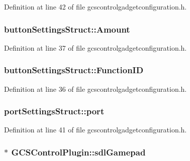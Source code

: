 Definition at line 42 of file gcscontrolgadgetconfiguration.\-h.

\hypertarget{group___g_c_s_control_gadget_plugin_gaaa14aa6512e6e46a95fcfd01c675cbf7}{
\subsubsection[{Amount}]{ button\-Settings\-Struct\-::\-Amount}}\label{group___g_c_s_control_gadget_plugin_gaaa14aa6512e6e46a95fcfd01c675cbf7}


Definition at line 37 of file gcscontrolgadgetconfiguration.\-h.

\hypertarget{group___g_c_s_control_gadget_plugin_ga0cf7694f3cc910d158e54851d077dd22}{
\subsubsection[{Function\-I\-D}]{ button\-Settings\-Struct\-::\-Function\-I\-D}}\label{group___g_c_s_control_gadget_plugin_ga0cf7694f3cc910d158e54851d077dd22}


Definition at line 36 of file gcscontrolgadgetconfiguration.\-h.

\hypertarget{group___g_c_s_control_gadget_plugin_ga0f8fc6e0cdd5eac4d00a2b169f94c7a3}{
\subsubsection[{port}]{ port\-Settings\-Struct\-::port}}\label{group___g_c_s_control_gadget_plugin_ga0f8fc6e0cdd5eac4d00a2b169f94c7a3}


Definition at line 41 of file gcscontrolgadgetconfiguration.\-h.

\hypertarget{group___g_c_s_control_gadget_plugin_ga3cd3b8ed3b17b5405fb2f71803a65951}{
\subsubsection[{sdl\-Gamepad}]{$\ast$ G\-C\-S\-Control\-Plugin\-::sdl\-Gamepad}}\label{group___g_c_s_control_gadget_plugin_ga3cd3b8ed3b17b5405fb2f71803a65951}


